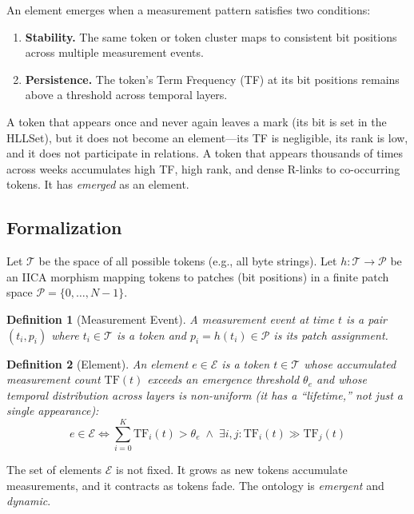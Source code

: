 \documentclass[11pt,a4paper]{article}
\newtheorem{definition}{Definition}[section]
\theoremstyle{remark}
\begin{document}
An element emerges when a measurement pattern satisfies two conditions:
\begin{enumerate}[leftmargin=*,nosep]
  \item \textbf{Stability.} The same token or token cluster maps to consistent bit
    positions across multiple measurement events.
  \item \textbf{Persistence.} The token's Term Frequency (TF) at its bit positions
    remains above a threshold across temporal layers.
\end{enumerate}

A token that appears once and never again leaves a mark (its bit is set in the HLLSet),
but it does not become an element---its TF is negligible, its rank is low, and it does
not participate in relations. A token that appears thousands of times across weeks
accumulates high TF, high rank, and dense R-links to co-occurring tokens. It has
\textit{emerged} as an element.

\subsection{Formalization}

Let $\mathcal{T}$ be the space of all possible tokens (e.g., all byte strings). Let
$h: \mathcal{T} \to \mathcal{P}$ be an IICA morphism mapping tokens to patches (bit
positions) in a finite patch space $\mathcal{P} = \{0,\ldots,N-1\}$.

\begin{definition}[Measurement Event]
A measurement event at time $t$ is a pair $(t_i, p_i)$ where $t_i \in \mathcal{T}$ is a
token and $p_i = h(t_i) \in \mathcal{P}$ is its patch assignment.
\end{definition}

\begin{definition}[Element]
An element $e \in \mathcal{E}$ is a token $t \in \mathcal{T}$ whose accumulated
measurement count $\text{TF}(t)$ exceeds an emergence threshold $\theta_e$ and whose
temporal distribution across layers is non-uniform (it has a ``lifetime,'' not just a
single appearance):
\begin{equation}
  e \in \mathcal{E} \iff \sum_{i=0}^{K} \text{TF}_i(t) > \theta_e
  \;\land\; \exists i,j: \text{TF}_i(t) \gg \text{TF}_j(t)
\end{equation}
\end{definition}

The set of elements $\mathcal{E}$ is not fixed. It grows as new tokens accumulate
measurements, and it contracts as tokens fade. The ontology is \textit{emergent} and
\textit{dynamic}.
\end{document}
